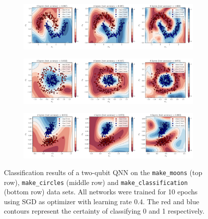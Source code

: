\documentclass[a4paper,10pt]{article}
\begin{document}
\begin{appendices}
\begin{figure}[ht]
	\centering
	\begin{subfigure}{.945\textwidth}
		\centering
		\includegraphics[width=1\linewidth]{figures/qnn_moons_classification.pdf}
	\end{subfigure}
	\begin{subfigure}{.945\textwidth}
		\centering
		\includegraphics[width=1\linewidth]{figures/qnn_circles_classification.pdf}
	\end{subfigure}
	\begin{subfigure}{.945\textwidth}
		\centering
		\includegraphics[width=1\linewidth]{figures/qnn_linear_classification.pdf}
	\end{subfigure}
	\cprotect\caption{Classification results of a two-qubit QNN on the \verb|make_moons| (top row), \verb|make_circles| (middle row) and \verb|make_classification| (bottom row) data sets. All networks were trained for 10 epochs using SGD as optimizer with learning rate 0.4. The red and blue contours represent the certainty of classifying 0 and 1 respectively.}
	\label{fig:classification_decision_regions}
\end{figure}


\end{appendices}
\end{document}
